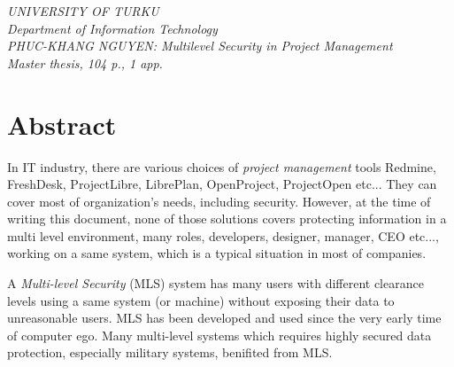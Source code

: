 

\begin{flushleft}{\slshape    
UNIVERSITY OF TURKU \\
Department of Information Technology \\
\medskip
PHUC-KHANG NGUYEN: Multilevel Security in Project Management \\
\medskip
Master thesis, 104 p., 1 app. \\
} 
\end{flushleft}


\begingroup
\let\clearpage\relax
\let\cleardoublepage\relax
\let\cleardoublepage\relax

\chapter*{Abstract} %

In IT industry, there are various choices of \emph{project management} tools \eg Redmine, FreshDesk, ProjectLibre, LibrePlan, OpenProject, ProjectOpen etc...
They can cover most of organization's needs, including security.
However, at the time of writing this document, none of those solutions covers protecting information in a multi level environment, \ie many roles, \eg developers, designer, manager, CEO etc..., working on a same system, which is a typical situation in most of companies. 

A \emph{Multi-level Security} (MLS) system has many users with different clearance levels using a same system (or machine) without exposing their data to unreasonable users.
MLS has been developed and used since the very early time of computer ego.
Many multi-level systems which requires highly secured data protection, especially military systems, benifited from MLS.

